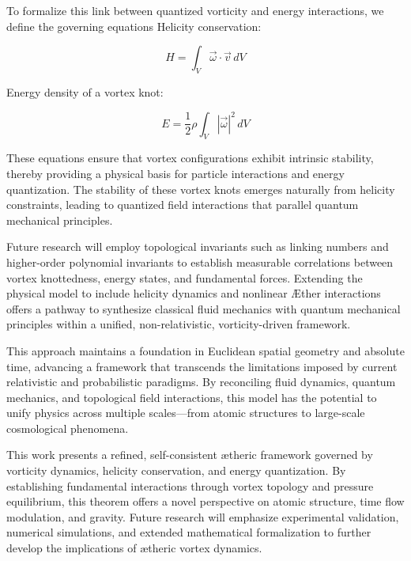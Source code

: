 \documentclass[a4paper,10pt]{article}
\begin{document}
To formalize this link between quantized vorticity and energy interactions, we define the governing equations Helicity conservation:

    \begin{equation*}
        H = \int_V \vec{\omega} \cdot \vec{v} \, dV\label{eq:HelicityConservation}
    \end{equation*}

Energy density of a vortex knot:

    \begin{equation*}
        E = \frac{1}{2} \rho \int_V |\vec{\omega}|^2 \, dV\label{eq:EnergyDensity}
    \end{equation*}

These equations ensure that vortex configurations exhibit intrinsic stability, thereby providing a physical basis for particle interactions and energy quantization. The stability of these vortex knots emerges naturally from helicity constraints, leading to quantized field interactions that parallel quantum mechanical principles.

Future research will employ topological invariants such as linking numbers and higher-order polynomial invariants to establish measurable correlations between vortex knottedness, energy states, and fundamental forces. Extending the physical model to include helicity dynamics and nonlinear Æther interactions offers a pathway to synthesize classical fluid mechanics with quantum mechanical principles within a unified, non-relativistic, vorticity-driven framework.

This approach maintains a foundation in Euclidean spatial geometry and absolute time, advancing a framework that transcends the limitations imposed by current relativistic and probabilistic paradigms. By reconciling fluid dynamics, quantum mechanics, and topological field interactions, this model has the potential to unify physics across multiple scales—from atomic structures to large-scale cosmological phenomena.


This work presents a refined, self-consistent ætheric framework governed by vorticity dynamics, helicity conservation, and energy quantization. By establishing fundamental interactions through vortex topology and pressure equilibrium, this theorem offers a novel perspective on atomic structure, time flow modulation, and gravity. Future research will emphasize experimental validation, numerical simulations, and extended mathematical formalization to further develop the implications of ætheric vortex dynamics.
\end{document}
